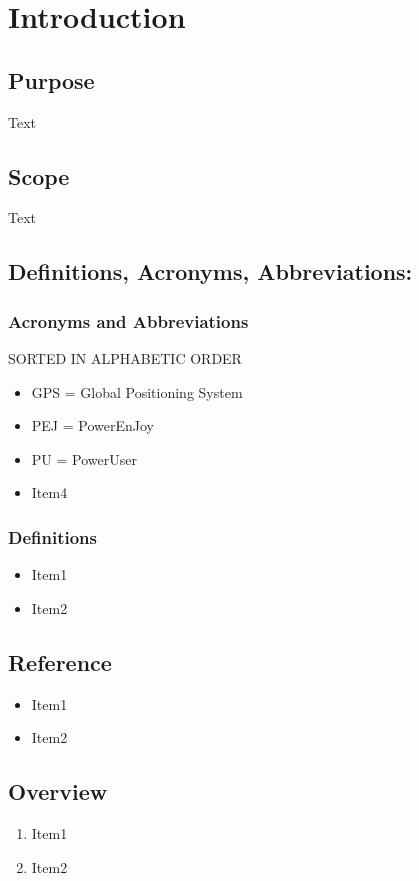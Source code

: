 \section{Introduction}
\subsection{Purpose}
Text
\subsection{Scope}
Text
\subsection{Definitions, Acronyms, Abbreviations:}
\subsubsection{Acronyms and Abbreviations}
SORTED IN ALPHABETIC ORDER
\begin{itemize}
\item GPS = Global Positioning System
\item PEJ = PowerEnJoy
\item PU = PowerUser
\item Item4
\end{itemize}
\subsubsection{Definitions}
\begin{itemize}
\item Item1
\item Item2
\end{itemize}
\subsection{Reference}
\begin{itemize}
\item Item1
\item Item2
\end{itemize}
\subsection{Overview}
\begin{enumerate}
\item Item1
\item Item2
\end{enumerate}